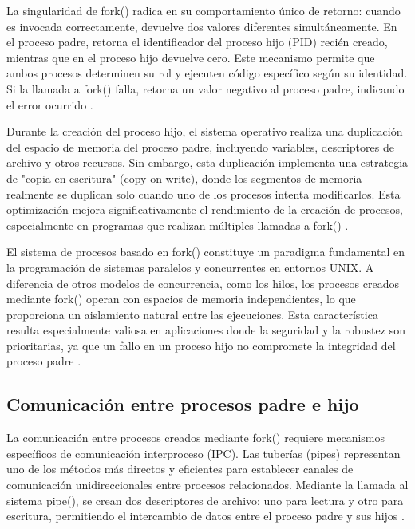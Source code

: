 {La singularidad de fork() radica en su comportamiento único de retorno: cuando es invocada correctamente, devuelve dos valores diferentes simultáneamente. En el proceso padre, retorna el identificador del proceso hijo (PID) recién creado, mientras que en el proceso hijo devuelve cero. Este mecanismo permite que ambos procesos determinen su rol y ejecuten código específico según su identidad. Si la llamada a fork() falla, retorna un valor negativo al proceso padre, indicando el error ocurrido \cite{kerrisk2010linux}.
\vspace{10pt}

Durante la creación del proceso hijo, el sistema operativo realiza una duplicación del espacio de memoria del proceso padre, incluyendo variables, descriptores de archivo y otros recursos. Sin embargo, esta duplicación implementa una estrategia de "copia en escritura" (copy-on-write), donde los segmentos de memoria realmente se duplican solo cuando uno de los procesos intenta modificarlos. Esta optimización mejora significativamente el rendimiento de la creación de procesos, especialmente en programas que realizan múltiples llamadas a fork() \cite{bovet2005understanding}.
\vspace{10pt}

El sistema de procesos basado en fork() constituye un paradigma fundamental en la programación de sistemas paralelos y concurrentes en entornos UNIX. A diferencia de otros modelos de concurrencia, como los hilos, los procesos creados mediante fork() operan con espacios de memoria independientes, lo que proporciona un aislamiento natural entre las ejecuciones. Esta característica resulta especialmente valiosa en aplicaciones donde la seguridad y la robustez son prioritarias, ya que un fallo en un proceso hijo no compromete la integridad del proceso padre \cite{love2013linux}.

\subsection{Comunicación entre procesos padre e hijo}

La comunicación entre procesos creados mediante fork() requiere mecanismos específicos de comunicación interproceso (IPC). Las tuberías (pipes) representan uno de los métodos más directos y eficientes para establecer canales de comunicación unidireccionales entre procesos relacionados. Mediante la llamada al sistema pipe(), se crean dos descriptores de archivo: uno para lectura y otro para escritura, permitiendo el intercambio de datos entre el proceso padre y sus hijos \cite{stevens2013advanced}.
\vspace{10pt}

}
